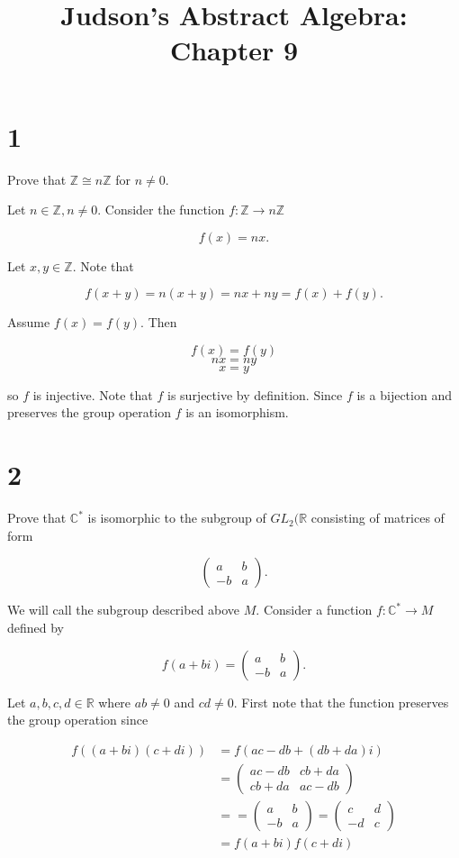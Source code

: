 \documentclass[a4paper]{article}
\title{Judson's Abstract Algebra: Chapter 9}
\date{}
\begin{document}
\maketitle

\section*{1}

Prove that $\mathbb{Z} \cong n \mathbb{Z}$ for $n \neq 0$.

\vspace{\baselineskip}

Let $n \in \mathbb{Z}, n \neq 0$. Consider the function $f : \mathbb{Z} \rightarrow n \mathbb{Z}$

$$f(x) = nx.$$

Let $x,y \in \mathbb{Z}$. Note that 

$$f(x+y) = n(x+y) = nx + ny = f(x) + f(y).$$

Assume $f(x) = f(y)$. Then

$$f(x) = f(y)$$
$$nx = ny$$
$$x = y$$

so $f$ is injective. Note that $f$ is surjective by definition. Since $f$ is a bijection and preserves the group operation $f$ is an isomorphism.


\section*{2} 

Prove that $\mathbb{C}^*$ is isomorphic to the subgroup of $GL_2(\mathbb{R}$ consisting of matrices of form

$$
  \begin{pmatrix}
    a & b \\
    -b & a
  \end{pmatrix}.$$
  
We will call the subgroup described above $M$. Consider a function $f : \mathbb{C}^* \rightarrow M$ defined by 

$$f(a+bi) = \begin{pmatrix}
    a & b \\
    -b & a
  \end{pmatrix}.$$
  
Let $a,b,c,d \in \mathbb{R}$ where $ab \neq 0$ and $cd \neq 0$. First note that the function preserves the group operation since

\begin{align*}
f((a+bi)(c+di)) &= f(ac-db + (db + da)i) \\
&= \begin{pmatrix}
    ac-db & cb + da \\
    cb + da & ac - db
  \end{pmatrix} \\
&= = \begin{pmatrix}
    a & b \\
    -b & a
  \end{pmatrix}
  = \begin{pmatrix}
    c & d \\
    -d & c
  \end{pmatrix} \\
&= f(a+bi)f(c+di)
\end{align*}
\end{document}

